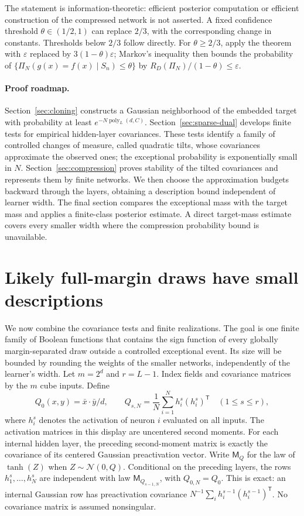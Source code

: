 \documentclass[11pt]{article}
\theoremstyle{remark}\newtheorem{remark}[theorem]{Remark}
\begin{document}
The statement is information-theoretic: efficient posterior computation or
efficient construction of the compressed network is not asserted.
A fixed confidence threshold $\theta\in(1/2,1)$ can replace $2/3$, with the
corresponding change in constants. Thresholds below $2/3$ follow directly.
For $\theta\geq2/3$, apply the theorem with $\varepsilon$ replaced by
$3(1-\theta)\varepsilon$; Markov's inequality then bounds the probability of
$\{\Pi_N(g(x)=f(x)\mid S_n)\leq\theta\}$ by $R_D(\Pi_N)/(1-\theta)\leq\varepsilon$.

\paragraph{Proof roadmap.}
Section~\ref{sec:cloning} constructs a Gaussian neighborhood of the embedded
target with probability at least $e^{-N\operatorname{poly}_L(d,C)}$.
Section~\ref{sec:sparse-dual} develops finite tests for empirical hidden-layer
covariances. These tests identify a family of controlled changes of measure,
called quadratic tilts, whose covariances approximate the observed ones;
the exceptional probability is exponentially small in $N$.
Section~\ref{sec:compression} proves stability of the tilted covariances and
represents them by finite networks. We then choose the approximation budgets
backward through the layers, obtaining a description bound independent of
learner width. The final section compares the exceptional mass with the
target mass and applies a finite-class posterior estimate. A direct
target-mass estimate covers every smaller width where the compression
probability bound is unavailable.





\section{Likely full-margin draws have small descriptions}
We now combine the covariance tests and finite realizations. The goal is
one finite family of Boolean functions that contains the sign function of
every globally margin-separated draw outside a controlled exceptional
event. Its size will be bounded by rounding the weights of the smaller
networks, independently of the learner's width.
Let $m=2^d$ and $r=L-1$. Index fields and covariance matrices by the
$m$ cube inputs. Define
\[
 Q_0(x,y)=\bar x\cdot\bar y/d,
 \qquad
 Q_{s,N}=\frac1N\sum_{i=1}^N h_i^s(h_i^s)^{\mathsf T}
 \quad(1\leq s\leq r),
\]
where $h_i^s$ denotes the activation of neuron $i$ evaluated on all inputs.
The activation matrices in this display are uncentered second moments.
For each internal hidden layer, the preceding second-moment matrix is
exactly the covariance of its centered Gaussian preactivation vector.
Write $\mathsf M_Q$ for the law of $\tanh(Z)$ when
$Z\sim\mathcal N(0,Q)$. Conditional on the preceding layers, the rows
$h_1^s,\ldots,h_N^s$ are independent with law
$\mathsf M_{Q_{s-1,N}}$, with $Q_{0,N}=Q_0$.
This is exact: an internal Gaussian row has preactivation covariance
$N^{-1}\sum_i h_i^{s-1}(h_i^{s-1})^{\mathsf T}$.
No covariance matrix is assumed nonsingular.
\end{document}
